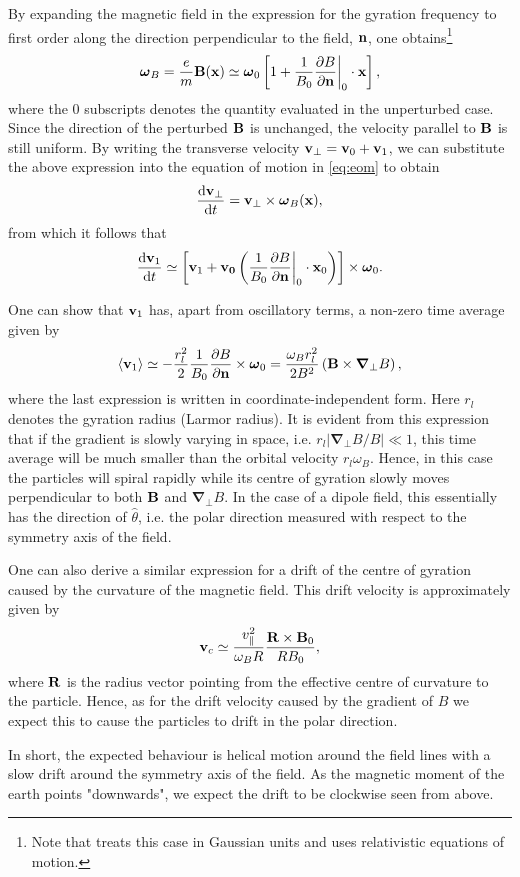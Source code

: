 
By expanding the magnetic field in the expression for the gyration frequency to first order along the direction perpendicular to the field, $\mathbf{n}$, one obtains\footnote{Note that \cite{Jackson:100964} treats this case in Gaussian units and uses relativistic equations of motion.}
\[
	\boldsymbol{\omega}_B = \frac{e}{m} \mathbf{B}(\mathbf{x}) \simeq \boldsymbol{\omega}_0 \left[
	1 + \frac{1}{B_0} \frac{\partial B}{\partial \mathbf{n}}\biggr\lvert_{0} \cdot \mathbf{x} \right],
\]
where the $0$ subscripts denotes the quantity evaluated in the unperturbed case. Since the direction of the perturbed $\mathbf{B}$ is unchanged, the velocity parallel to $\mathbf{B}$ is still uniform. By writing the transverse velocity $\mathbf{v}_\perp = \mathbf{v}_0 + \mathbf{v}_1$, we can substitute the above expression into the equation of motion in \ref{eq:eom} to obtain
\[
	\frac{\text{d} \mathbf{v}_\perp}{\text{d} t} = \mathbf{v}_\perp \times \boldsymbol{\omega}_B(\mathbf{x}),
\]
from which it follows that  
\[
	\frac{\text{d} \mathbf{v}_1}{\text{d} t} \simeq \left[ \mathbf{v}_1 + \mathbf{v_0} \left(\frac{1}{B_0} \frac{\partial B}{\partial \mathbf{n}}\biggr\lvert_{0} \cdot \mathbf{x}_0 \right) \right] \times \boldsymbol{\omega}_0.
\]

One can show that $\mathbf{v}_1$ has, apart from oscillatory terms, a non-zero time average given by 
\begin{equation}\label{eq:v_grad}
	\langle \mathbf{v}_1 \rangle \simeq - \frac{r_l^2}{2} \frac{1}{B_0} \frac{\partial B}{\partial \mathbf{n}} \times \boldsymbol{\omega}_0 = \frac{\omega_B r_l ^2}{2 B^2} \left( \mathbf{B} \times \boldsymbol{\nabla}_\perp B\right),
\end{equation}
where the last expression is written in coordinate-independent form. Here $r_l$ denotes the gyration radius (Larmor radius). It is evident from this expression that if the gradient is slowly varying in space, i.e. $r_l \vert \boldsymbol{\nabla}_\perp B / B \vert \ll 1$, this time average will be much smaller than the orbital velocity $r_l \omega_B$. Hence, in this case the particles will spiral rapidly while its centre of gyration slowly moves perpendicular to both $\mathbf{B}$ and $\boldsymbol{\nabla}_\perp B$. In the case of a dipole field, this essentially has the direction of $\hat{\theta}$, i.e. the polar direction measured with respect to the symmetry axis of the field.

One can also derive a similar expression for a drift of the centre of gyration caused by the curvature of the magnetic field. This drift velocity is approximately given by
\begin{equation}\label{eq:v_curv}
	\mathbf{v}_c \simeq \frac{v_{\parallel}^2}{\omega_B R} \frac{\mathbf{R} \times \mathbf{B}_0}{R B_0},
\end{equation}
where $\mathbf{R}$ is the radius vector pointing from the effective centre of curvature to the particle. Hence, as for the drift velocity caused by the gradient of $B$ we expect this to cause the particles to drift in the polar direction.

In short, the expected behaviour is helical motion around the field lines with a slow drift around the symmetry axis of the field. As the magnetic moment of the earth points "downwards", we expect the drift to be clockwise seen from above.